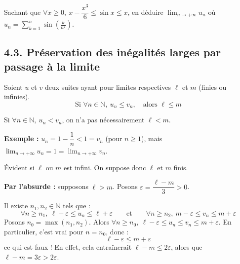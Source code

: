 \documentclass[a4paper,11pt]{article}
\newcommand{\N}{\mathbb{N}}
\begin{document}
\begin{exemples}
Sachant que $\forall x \ge 0, \ x - \dfrac{x^3}{6} \le \sin x \le x$, en déduire $\displaystyle\lim_{n \to +\infty} u_n$ où $u_n = \displaystyle\sum_{k=1}^n \sin\left(\frac{k}{n^2}\right)$.
\end{exemples}

\newpage
\subsection{4.3. Préservation des inégalités larges par passage à la limite}

\begin{proposition}
Soient $u$ et $v$ deux suites ayant pour limites respectives $\ell$ et $m$ (finies ou infinies).
\[
\text{Si } \forall n \in \N, \ u_n \le v_n, \quad \text{alors } \ell \le m
\]
\end{proposition}

\begin{remarque}
Si $\forall n \in \N, \ u_n < v_n$, on n'a pas nécessairement $\ell < m$.

\textbf{Exemple :} $u_n = 1 - \dfrac{1}{n} < 1 = v_n$ (pour $n \ge 1$), mais $\displaystyle\lim_{n \to +\infty} u_n = 1 = \lim_{n \to +\infty} v_n$.
\end{remarque}

\begin{demonstration}
Évident si $\ell$ ou $m$ est infini. On suppose donc $\ell$ et $m$ finis.

\textbf{Par l'absurde :} supposons $\ell > m$. Posons $\varepsilon = \dfrac{\ell - m}{3} > 0$.

Il existe $n_1, n_2 \in \N$ tels que :
\[
\forall n \ge n_1, \ \ell - \varepsilon \le u_n \le \ell + \varepsilon \qquad \text{et} \qquad \forall n \ge n_2, \ m - \varepsilon \le v_n \le m + \varepsilon
\]
Posons $n_0 = \max(n_1, n_2)$. Alors $\forall n \ge n_0, \ \ell - \varepsilon \le u_n \le v_n \le m + \varepsilon$. En particulier, c'est vrai pour $n = n_0$, donc :
\[
\ell - \varepsilon \le m + \varepsilon
\]
ce qui est faux ! En effet, cela entraînerait $\ell - m \le 2\varepsilon$, alors que $\ell - m = 3\varepsilon > 2\varepsilon$.
\end{demonstration}
\end{document}

